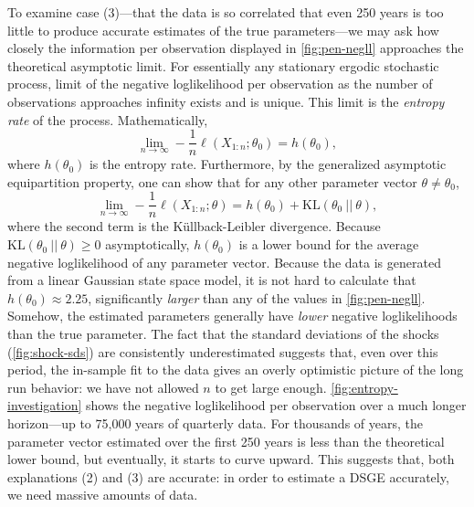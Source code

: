 \documentclass[11pt]{article}
\begin{document}
To examine case (3)---that the data is so correlated that even 250 years
is too little to produce accurate estimates of the true parameters---we
may ask how closely the information per observation displayed in
\autoref{fig:pen-negll} approaches the theoretical asymptotic limit. For
essentially any stationary ergodic stochastic process, limit of the
negative loglikelihood per observation as the number of observations
approaches infinity exists and is unique. This limit is the
\emph{entropy rate} of the process. Mathematically, \[
\lim_{n\rightarrow\infty} -\frac{1}{n}\ell(X_{1:n}; \theta_0) = h(\theta_0),
\] where \(h(\theta_0)\) is the entropy rate. Furthermore, by the
generalized asymptotic equipartition property, one can show that for any
other parameter vector \(\theta \neq \theta_0\), \[
\lim_{n\rightarrow\infty} -\frac{1}{n}\ell(X_{1:n}; \theta) = h(\theta_0) + \mathrm{KL}(\theta_0\ ||\ \theta),
\] where the second term is the Küllback-Leibler divergence. Because
\(\mathrm{KL}(\theta_0\ ||\ \theta) \geq 0\) asymptotically,
\(h(\theta_0)\) is a lower bound for the average negative loglikelihood
of any parameter vector. Because the data is generated from a linear
Gaussian state space model, it is not hard to calculate that
\(h(\theta_0) \approx 2.25\), significantly \emph{larger} than any of
the values in \autoref{fig:pen-negll}. Somehow, the estimated parameters
generally have \emph{lower} negative loglikelihoods than the true
parameter. The fact that the standard deviations of the shocks
(\autoref{fig:shock-sds}) are consistently underestimated suggests that,
even over this period, the in-sample fit to the data gives an overly
optimistic picture of the long run behavior: we have not allowed \(n\)
to get large enough. \autoref{fig:entropy-investigation} shows the
negative loglikelihood per observation over a much longer horizon---up
to 75,000 years of quarterly data. For thousands of years, the parameter
vector estimated over the first 250 years is less than the theoretical
lower bound, but eventually, it starts to curve upward. This suggests
that, both explanations (2) and (3) are accurate: in order to estimate a
DSGE accurately, we need massive amounts of data.
\end{document}
